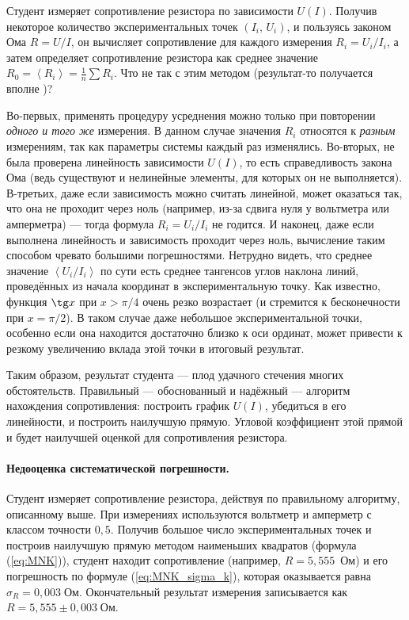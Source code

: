 Студент измеряет сопротивление резистора по зависимости $U\!\left(I\right)$.
Получив некоторое количество экспериментальных точек
$\left(I_{i},\,U_{i}\right)$,
и пользуясь законом Ома $R=U/I$, он вычисляет сопротивление для каждого
измерения $R_{i}=U_{i}/I_{i}$, а затем определяет сопротивление резистора
как среднее значение $R_{0}=\left\langle R_{i}\right\rangle =\frac{1}{n}\sum
R_{i}$.
Что не так с этим методом (результат-то получается вполне )?

\begin{longnote}
    Во-первых, применять процедуру усреднения можно только
    при повторении \emph{одного и того же} измерения. В данном случае значения
$R_{i}$
    относятся к \emph{разным} измерениям, так как параметры системы каждый раз
изменялись.
    Во-вторых, не была проверена линейность зависимости $U\left(I\right)$, то
есть
    справедливость закона Ома (ведь существуют и нелинейные элементы,
    для которых он не выполняется). В-третьих, даже если зависимость
    можно считать линейной, может оказаться так, что она не проходит через
    ноль (например, из-за сдвига нуля у вольтметра или амперметра) ---
    тогда формула $R_{i}=U_{i}/I_{i}$ не годится.
    И наконец, даже если выполнена линейность и зависимость проходит через
    ноль, вычисление таким способом чревато большими погрешностями. Нетрудно
    видеть, что среднее значение $\left\langle U_{i}/I_{i}\right\rangle $
    по сути есть среднее тангенсов углов наклона линий, проведённых из
    начала координат в экспериментальную точку. Как известно,
    функция $\tg x$ при $x>\pi/4$ очень резко возрастает (и стремится
    к бесконечности при $x=\pi/2$). В таком случае даже небольшое 
    экспериментальной точки, особенно если она находится достаточно близко
    к оси ординат, может привести к резкому увеличению вклада этой точки
    в итоговый результат.

    Таким образом,  результат студента --- плод удачного стечения
многих
    обстоятельств. Правильный --- обоснованный и надёжный --- алгоритм
    нахождения сопротивления: построить график $U\left(I\right)$, убедиться
    в его линейности, и построить наилучшую прямую. 
    Угловой коэффициент этой прямой и будет наилучшей оценкой 
    для сопротивления резистора.
\end{longnote}


\paragraph{Недооценка систематической погрешности.}
Студент измеряет сопротивление резистора, действуя по правильному
алгоритму, описанному выше. При измерениях используются вольтметр
и амперметр с классом точности $0{,}5$. Получив большое число экспериментальных
точек и построив наилучшую прямую методом наименьших квадратов (формула
(\ref{eq:MNK})), студент находит сопротивление (например, $R=5{,}555$~Ом)
и его погрешность по формуле (\ref{eq:MNK_sigma_k}), которая оказывается
равна $\sigma_{R}=0{,}003\;\text{Ом}.$ Окончательный результат измерения
записывается как $R=5{,}555\pm0{,}003\;\text{Ом}$.

